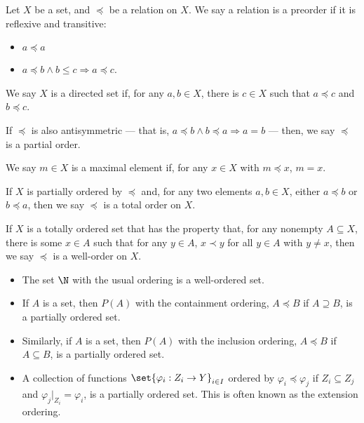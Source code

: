 \begin{definition}
Let $X$ be a set, and $\preceq $ be a relation on $X$. We say a relation is a preorder if it is reflexive and transitive:
\begin{itemize}
  \item $a\preceq a$
  \item $a\preceq b \wedge b\leq c\Rightarrow a\preceq c$.
\end{itemize}
We say $X$ is a directed set if, for any $a,b\in X$, there is $c\in X$ such that $a\preceq c$ and $b\preceq c$.\newline

If $\preceq$ is also antisymmetric --- that is, $a\preceq b\wedge b\preceq a \Rightarrow a = b$ --- then, we say $\preceq$ is a partial order.\newline

We say $m\in X$ is a maximal element if, for any $x\in X$ with $m\preceq x$, $m = x$.\newline

If $X$ is partially ordered by $\preceq$ and, for any two elements $a,b\in X$, either $a\preceq b$ or $b\preceq a$, then we say $\preceq$ is a total order on $X$.\newline

If $X$ is a totally ordered set that has the property that, for any nonempty $A\subseteq X$, there is some $x\in A$ such that for any $y\in A$, $x\prec y$ for all $y \in A$ with $y\neq x$, then we say $\preceq$ is a well-order on $X$.
\end{definition}
\begin{example}
  \begin{itemize}
    \item The set $\N$ with the usual ordering is a well-ordered set.
    \item If $A$ is a set, then $P(A)$ with the containment ordering, $A\preceq B$ if $A\supseteq B$, is a partially ordered set.
    \item Similarly, if $A$ is a set, then $P(A)$ with the inclusion ordering, $A\preceq B$ if $A\subseteq B$, is a partially ordered set.
    \item A collection of functions $\set{\varphi_{i}: Z_i\rightarrow Y}_{i\in I}$ ordered by $\varphi_{i}\preceq \varphi_j$ if $Z_i\subseteq Z_j$ and $\varphi_{j}|_{Z_i} = \varphi_i$, is a partially ordered set. This is often known as the extension ordering.
  \end{itemize}
\end{example}

